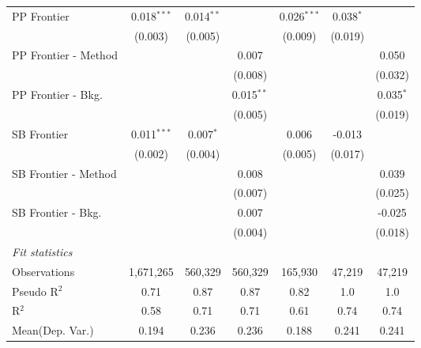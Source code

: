 \begin{tabular}{lcccccc}
   PP Frontier          & 0.018$^{***}$  & 0.014$^{**}$   &                & 0.026$^{***}$  & 0.038$^{*}$    &   \\   
                        & (0.003)        & (0.005)        &                & (0.009)        & (0.019)        &   \\   
   PP Frontier - Method &                &                & 0.007          &                &                & 0.050\\   
                        &                &                & (0.008)        &                &                & (0.032)\\   
   PP Frontier - Bkg.   &                &                & 0.015$^{**}$   &                &                & 0.035$^{*}$\\   
                        &                &                & (0.005)        &                &                & (0.019)\\   
   SB Frontier          & 0.011$^{***}$  & 0.007$^{*}$    &                & 0.006          & -0.013         &   \\   
                        & (0.002)        & (0.004)        &                & (0.005)        & (0.017)        &   \\   
   SB Frontier - Method &                &                & 0.008          &                &                & 0.039\\   
                        &                &                & (0.007)        &                &                & (0.025)\\   
   SB Frontier - Bkg.   &                &                & 0.007          &                &                & -0.025\\   
                        &                &                & (0.004)        &                &                & (0.018)\\   
   \midrule
   \emph{Fit statistics}\\
   Observations         & 1,671,265      & 560,329        & 560,329        & 165,930        & 47,219         & 47,219\\  
   Pseudo R$^2$         & 0.71           & 0.87           & 0.87           & 0.82           & 1.0            & 1.0\\  
   R$^2$                & 0.58           & 0.71           & 0.71           & 0.61           & 0.74           & 0.74\\  
Mean(Dep. Var.) & 0.194 & 0.236 & 0.236 & 0.188 & 0.241 & 0.241 \\
   

\end{tabular}
